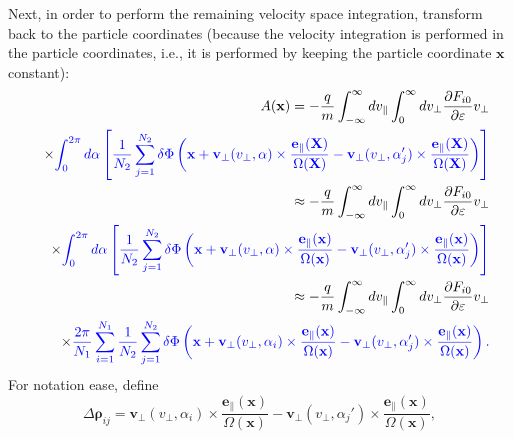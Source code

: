 \documentclass{llncs}
\newcommand{\tmcolor}[2]{{\color{#1}{#2}}}
\begin{document}
Next, in order to perform the remaining velocity space integration, transform
back to the particle coordinates (because the velocity integration is
performed in the particle coordinates, i.e., it is performed by keeping the
particle coordinate $\mathbf{x}$ constant):
\begin{eqnarray}
  &  & A (\mathbf{x}) = - \frac{q}{m} \int_{- \infty}^{\infty} d
  v_{\parallel} \int_0^{\infty} d v_{\perp} \frac{\partial F_{i 0}}{\partial
  \varepsilon} v_{\perp} \nonumber\\
  &  & \times \tmcolor{blue}{\int_0^{2 \pi} d \alpha \left[ \frac{1}{N_2}
  \sum_{j = 1}^{N_2} \delta \Phi \left( \mathbf{x} +\mathbf{v}_{\perp}
  (v_{\perp}, \alpha) \times \frac{\mathbf{e}_{\parallel} (\mathbf{X})}{\Omega
  (\mathbf{X})} -\mathbf{v}_{\perp} (v_{\perp}, \alpha_j') \times
  \frac{\mathbf{e}_{\parallel} (\mathbf{X})}{\Omega (\mathbf{X})} \right)
  \right]} \nonumber\\
  &  & \approx - \frac{q}{m} \int_{- \infty}^{\infty} d v_{\parallel}
  \int_0^{\infty} d v_{\perp} \frac{\partial F_{i 0}}{\partial \varepsilon}
  v_{\perp} \nonumber\\
  &  & \times \tmcolor{blue}{\int_0^{2 \pi} d \alpha \left[ \frac{1}{N_2}
  \sum_{j = 1}^{N_2} \delta \Phi \left( \mathbf{x} +\mathbf{v}_{\perp}
  (v_{\perp}, \alpha) \times \frac{\mathbf{e}_{\parallel} (\mathbf{x})}{\Omega
  (\mathbf{x})} -\mathbf{v}_{\perp} (v_{\perp}, \alpha_j') \times
  \frac{\mathbf{e}_{\parallel} (\mathbf{x})}{\Omega (\mathbf{x})} \right)
  \right]} \nonumber\\
  &  & \approx - \frac{q}{m}  \int_{- \infty}^{\infty} d v_{\parallel}
  \int_0^{\infty} d v_{\perp} \frac{\partial F_{i 0}}{\partial \varepsilon}
  v_{\perp} \nonumber\\
  &  & \times \tmcolor{blue}{\frac{2 \pi}{N_1} \sum_{i = 1}^{N_1}
  \frac{1}{N_2}  \sum_{j = 1}^{N_2} \delta \Phi \left( \mathbf{x}
  +\mathbf{v}_{\perp} (v_{\perp}, \alpha_i) \times
  \frac{\mathbf{e}_{\parallel} (\mathbf{x})}{\Omega (\mathbf{x})}
  -\mathbf{v}_{\perp} (v_{\perp}, \alpha_j') \times
  \frac{\mathbf{e}_{\parallel} (\mathbf{x})}{\Omega (\mathbf{x})} \right) .} 
  \label{21-9-16-a4}
\end{eqnarray}
For notation ease, define
\begin{equation}
  \Delta \mathbf{\rho}_{i j} =\mathbf{v}_{\perp} (v_{\perp}, \alpha_i) \times
  \frac{\mathbf{e}_{\parallel} (\mathbf{x})}{\Omega (\mathbf{x})}
  -\mathbf{v}_{\perp} (v_{\perp}, \alpha_j') \times
  \frac{\mathbf{e}_{\parallel} (\mathbf{x})}{\Omega (\mathbf{x})},
\end{equation}
\end{document}
